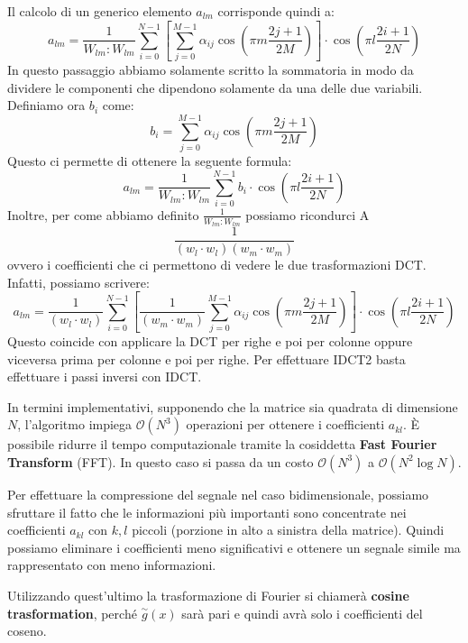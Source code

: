 Il calcolo di un generico elemento $a_{lm}$ corrisponde quindi a:
\begin{equation*}
    a_{lm} = \frac{1}{W_{lm}:W_{lm}} \sum_{i=0}^{N-1}\left[\sum_{j=0}^{M-1}
        \alpha_{ij} \cos \left(\pi m \frac{2j+1}{2M}\right)\right]\cdot \cos \left(\pi l
    \frac{2i+1}{2N}\right)
\end{equation*}
In questo passaggio abbiamo solamente scritto la sommatoria in modo da
dividere le componenti che dipendono solamente da una delle due variabili.
Definiamo ora $b_i$ come:
\begin{equation*}
    b_i = \sum_{j=0}^{M-1} \alpha_{ij} \cos \left(\pi m \frac{2j+1}{2M}\right)
\end{equation*}
Questo ci permette di ottenere la seguente formula:
\begin{equation*}
    a_{lm} = \frac{1}{W_{lm}:W_{lm}} \sum_{i=0}^{N-1}b_i\cdot \cos \left(\pi l \frac{2i+1}{2N}\right)
\end{equation*}
Inoltre, per come abbiamo definito $\frac{1}{W_{lm}:W_{lm}}$ possiamo ricondurci A
\begin{equation*}
    \frac{1}{(w_{l}\cdot w_l)(w_{m}\cdot w_m)}
\end{equation*}
ovvero i coefficienti che ci permettono di vedere le due trasformazioni DCT. Infatti,
possiamo scrivere:
\begin{equation*}
    a_{lm} = \frac{1}{(w_{l}\cdot w_l)} \sum_{i=0}^{N-1}\left[ \frac{1}{(w_m\cdot
            w_m)}\sum_{j=0}^{M-1} \alpha_{ij} \cos \left(\pi m \frac{2j+1}{2M}\right)\right]
    \cdot \cos \left(\pi l \frac{2i+1}{2N}\right)
\end{equation*}
Questo coincide con applicare la DCT per righe e poi per colonne oppure viceversa
prima per colonne e poi per righe. Per effettuare IDCT2 basta effettuare i passi
inversi con IDCT.

In termini implementativi, supponendo che la matrice sia quadrata di dimensione
$N$, l'algoritmo impiega $\mathcal{O}(N^3)$ operazioni per ottenere i coefficienti
$a_{kl}$. È possibile ridurre il tempo computazionale tramite la cosiddetta
\textbf{Fast Fourier Transform} (FFT). In questo caso si passa da un costo
$\mathcal{O}(N^3)$ a $\mathcal{O}(N^2 \log N)$.

Per effettuare la compressione del segnale nel caso bidimensionale, possiamo
sfruttare il fatto che le informazioni più importanti sono concentrate nei
coefficienti $a_{kl}$ con $k,l$ piccoli (porzione in alto a sinistra della matrice).
Quindi possiamo eliminare i coefficienti meno significativi e ottenere un segnale
simile ma rappresentato con meno informazioni.


Utilizzando quest'ultimo la trasformazione di Fourier si chiamerà \textbf{cosine trasformation},
perché $\stackrel{\sim}{g}(x)$ sarà pari e quindi avrà solo i coefficienti del coseno.
